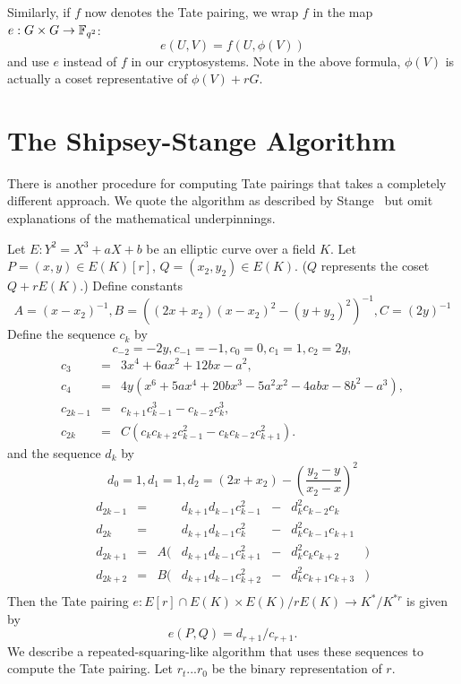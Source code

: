 Similarly, if $f$ now denotes the Tate pairing, we wrap $f$ in the map
$e : G\times G \rightarrow \mathbb{F}_{q^2}$:
\[ e(U, V) = f(U, \phi(V)) \]
and use $e$ instead of $f$ in our cryptosystems. Note in the above
formula, $\phi(V)$ is actually a coset representative of $\phi(V) + rG$.

\section {The Shipsey-Stange Algorithm}
There is another procedure for computing Tate pairings that takes a completely
different approach. We quote the algorithm as described by Stange~\cite{stange}
but omit explanations of the mathematical underpinnings.

Let $E:Y^2 = X^3 + aX + b$ be an elliptic curve over a field $K$.
Let $P=(x, y) \in E(K)[r]$, $Q=(x_2, y_2) \in E(K)$. ($Q$ represents the
coset $Q + rE(K)$.)
Define constants
\[
    A = (x - x_2)^{-1},
    B = \left((2x + x_2)(x - x_2)^2 - (y + y_2)^2\right)^{-1},
    C = (2 y)^{-1}
\]
Define the sequence $c_k$ by
\[
    c_{-2} = -2y,
    c_{-1} = -1,
    c_0 = 0,
    c_1 = 1,
    c_2 = 2 y,
\]
\[
\begin{array}{lcl}
    c_3 &=& 3 x^4 + 6ax^2 + 12bx - a^2, \\
    c_4 &=& 4y(x^6+5ax^4+20bx^3-5a^2x^2-4abx-8b^2-a^3), \\
    c_{2k-1} &=& c_{k+1} c_{k-1}^3 - c_{k-2} c_k^3, \\
    c_{2k} &=& C(c_k c_{k+2} c_{k-1}^2 - c_k c_{k-2} c_{k+1}^2).
\end{array}
\]
and the sequence $d_k$ by
\[
    d_0 = 1,
    d_1 = 1,
    d_2 = (2x+x_2) - \left( \frac{y_2-y}{x_2-x} \right) ^2
\]
\[
\begin{array}{lcrlcll}
    d_{2k-1} &=& & d_{k+1} d_{k-1} c_{k-1}^2 &-& d_k^2 c_{k-2} c_{k}& \\ 
    d_{2k} &=& & d_{k+1} d_{k-1} c_{k}^2 &-& d_k^2 c_{k-1} c_{k+1}& \\
    d_{2k+1} &=& A(& d_{k+1} d_{k-1} c_{k+1}^2 &-& d_k^2 c_{k} c_{k+2}&) \\
    d_{2k+2} &=& B(& d_{k+1} d_{k-1} c_{k+2}^2 &-& d_k^2 c_{k+1} c_{k+3}&) \\
\end{array}
\]
Then the Tate pairing
$
e : E[r] \cap E(K) \times
E(K) / r E(K) \rightarrow
K^* / K^{*r}
$
is given by
\[
e(P,Q) = d_{r+1}/c_{r+1}.
\]
We describe a repeated-squaring-like algorithm that uses these sequences
to compute the Tate pairing.
Let $r_t ... r_0$ be the binary representation of $r$.

